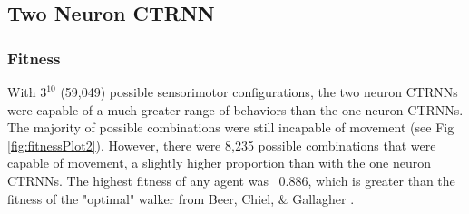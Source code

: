 \documentclass{article}
\begin{document}
\subsection{Two Neuron CTRNN}  

\subsubsection{Fitness}
With \(3^{10}\) (59,049) possible sensorimotor configurations, the two neuron CTRNNs were capable of a much greater range of behaviors than the one neuron CTRNNs. The majority of possible combinations were still incapable of movement (see Fig \ref{fig:fitnessPlot2}). However, there were 8,235 possible combinations that were capable of movement, a slightly higher proportion than with the one neuron CTRNNs. The highest fitness of any agent was ~0.886, which is greater than the fitness of the "optimal" walker from Beer, Chiel, \& Gallagher \cite{BeerOptimal}.
\end{document}
